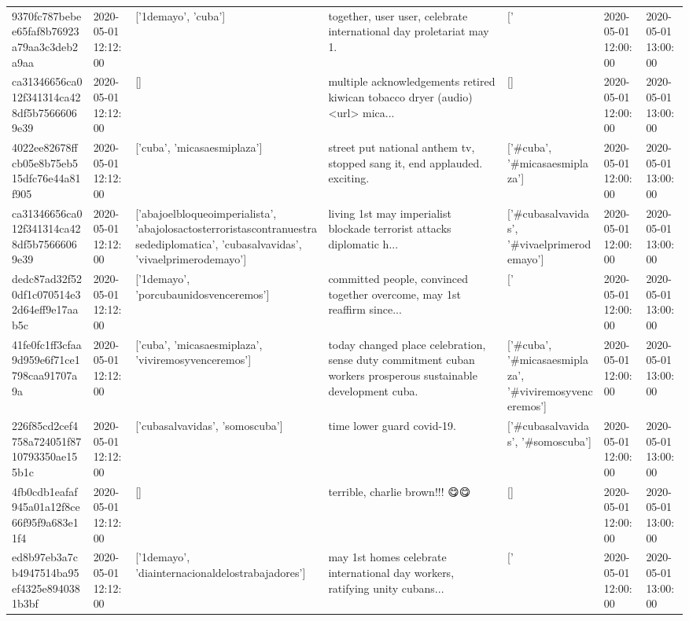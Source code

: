 \begin{tabular}{lllllll}
9370fc787bebee65faf8b76923a79aa3c3deb2a9aa & 2020-05-01 12:12:00 & ['1demayo', 'cuba'] & together, user user, celebrate international day proletariat may 1. & ['#1demayo', '#cuba'] & 2020-05-01 12:00:00 & 2020-05-01 13:00:00 \\
ca31346656ca012f341314ca428df5b75666069e39 & 2020-05-01 12:12:00 & [] & multiple acknowledgements retired kiwican tobacco dryer (audio) <url> mica... & [] & 2020-05-01 12:00:00 & 2020-05-01 13:00:00 \\
4022ee82678ffcb05e8b75eb515dfc76e44a81f905 & 2020-05-01 12:12:00 & ['cuba', 'micasaesmiplaza'] & street put national anthem tv, stopped sang it, end applauded. exciting. & ['#cuba', '#micasaesmiplaza'] & 2020-05-01 12:00:00 & 2020-05-01 13:00:00 \\
ca31346656ca012f341314ca428df5b75666069e39 & 2020-05-01 12:12:00 & ['abajoelbloqueoimperialista', 'abajolosactosterroristascontranuestrasedediplomatica', 'cubasalvavidas', 'vivaelprimerodemayo'] & living 1st may imperialist blockade terrorist attacks diplomatic h... & ['#cubasalvavidas', '#vivaelprimerodemayo'] & 2020-05-01 12:00:00 & 2020-05-01 13:00:00 \\
dedc87ad32f520df1c070514e32d64eff9e17aab5c & 2020-05-01 12:12:00 & ['1demayo', 'porcubaunidosvenceremos'] & committed people, convinced together overcome, may 1st reaffirm since... & ['#1demayo', '#porcubaunidosvenceremos'] & 2020-05-01 12:00:00 & 2020-05-01 13:00:00 \\
41fe0fc1ff3cfaa9d959e6f71ce1798caa91707a9a & 2020-05-01 12:12:00 & ['cuba', 'micasaesmiplaza', 'viviremosyvenceremos'] & today changed place celebration, sense duty commitment cuban workers prosperous sustainable development cuba. & ['#cuba', '#micasaesmiplaza', '#viviremosyvenceremos'] & 2020-05-01 12:00:00 & 2020-05-01 13:00:00 \\
226f85cd2cef4758a724051f8710793350ae155b1c & 2020-05-01 12:12:00 & ['cubasalvavidas', 'somoscuba'] & time lower guard covid-19. & ['#cubasalvavidas', '#somoscuba'] & 2020-05-01 12:00:00 & 2020-05-01 13:00:00 \\
4fb0cdb1eafaf945a01a12f8ce66f95f9a683e11f4 & 2020-05-01 12:12:00 & [] & terrible, charlie brown!!! 😋😋 & [] & 2020-05-01 12:00:00 & 2020-05-01 13:00:00 \\
ed8b97eb3a7cb4947514ba95ef4325e8940381b3bf & 2020-05-01 12:12:00 & ['1demayo', 'diainternacionaldelostrabajadores'] & may 1st homes celebrate international day workers, ratifying unity cubans... & ['#1demayo', '#diainternacionaldelostrabajadores'] & 2020-05-01 12:00:00 & 2020-05-01 13:00:00 \\

\end{tabular}

